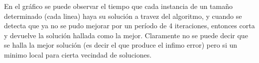   En el gráfico se puede observar el tiempo que cada instancia de un tamaño determinado (cada linea) haya su solución a travez del algoritmo, y cuando se detecta que ya no se pudo mejorar por un período de 4 iteraciones, entonces corta y devuelve la solución hallada como la mejor. Claramente no se puede decir que se halla la mejor solución (es decir el que produce el infimo error) pero si un minimo local para cierta vecindad de soluciones.
